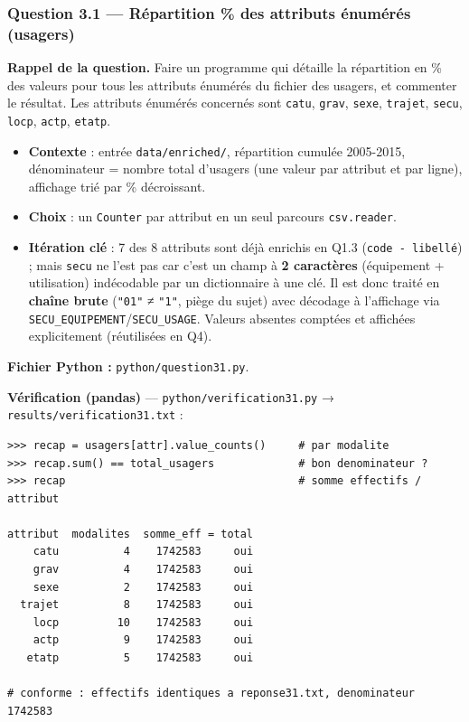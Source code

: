 \documentclass[11pt,a4paper]{article}
\newcommand{\rub}[2]{\textbf{\textcolor{#1}{#2}}}
\begin{document}
\clearpage
\subsubsection*{Question 3.1 — Répartition \% des attributs énumérés (usagers)}

\rub{labrappel}{Rappel de la question.} Faire un programme qui détaille la répartition en \% des valeurs pour tous les attributs énumérés du fichier des usagers, et commenter le résultat. Les attributs énumérés concernés sont \texttt{catu}, \texttt{grav}, \texttt{sexe}, \texttt{trajet}, \texttt{secu}, \texttt{locp}, \texttt{actp}, \texttt{etatp}.

\begin{agentbox}
\begin{itemize}
\item \textbf{Contexte} : entrée \texttt{data/enriched/}, répartition cumulée 2005-2015, dénominateur = nombre total d'usagers (une valeur par attribut et par ligne), affichage trié par \% décroissant.
\item \textbf{Choix} : un \texttt{Counter} par attribut en un seul parcours \texttt{csv.reader}.
\item \textbf{Itération clé} : 7 des 8 attributs sont déjà enrichis en Q1.3 (\texttt{code - libellé}) ; mais \texttt{secu} ne l'est pas car c'est un champ à \textbf{2 caractères} (équipement + utilisation) indécodable par un dictionnaire à une clé. Il est donc traité en \textbf{chaîne brute} (\texttt{"01"} ≠ \texttt{"1"}, piège du sujet) avec décodage à l'affichage via \texttt{SECU\_EQUIPEMENT}/\texttt{SECU\_USAGE}. Valeurs absentes comptées et affichées explicitement (réutilisées en Q4).
\end{itemize}
\end{agentbox}

\rub{labfichier}{Fichier Python :} \texttt{python/question31.py}.

\rub{labverif}{Vérification (pandas)} --- \texttt{python/verification31.py} → \texttt{results/verification31.txt} :

\begin{lstlisting}[style=pyblock]
>>> recap = usagers[attr].value_counts()     # par modalite
>>> recap.sum() == total_usagers             # bon denominateur ?
>>> recap                                    # somme effectifs / attribut

attribut  modalites  somme_eff = total
    catu          4    1742583     oui
    grav          4    1742583     oui
    sexe          2    1742583     oui
  trajet          8    1742583     oui
    locp         10    1742583     oui
    actp          9    1742583     oui
   etatp          5    1742583     oui

# conforme : effectifs identiques a reponse31.txt, denominateur 1742583
\end{lstlisting}
\end{document}
